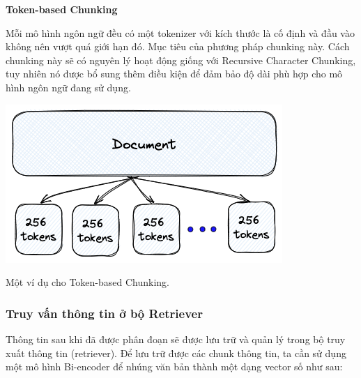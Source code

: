 \documentclass[a4paper, 12pt, openany]{book}
\begin{document}
\vspace{0.5cm}

\textbf{Token-based Chunking}

Mỗi mô hình ngôn ngữ đều có một tokenizer với kích thước là cố định và đầu vào không nên vượt quá giới hạn đó. Mục tiêu của phương pháp chunking
này. Cách chunking này sẽ có nguyên lý hoạt động giống với Recursive Character Chunking, tuy nhiên nó được bổ sung thêm điều kiện để đảm bảo độ dài phù hợp
cho mô hình ngôn ngữ đang sử dụng.

\vspace{0.5cm}

\begin{minipage}{\linewidth}
    \centering
    \includegraphics[width=\linewidth]{./assets/images/token-chunking.png}
    \captionsetup{type=figure}
    \caption{Một ví dụ cho Token-based Chunking.}
\end{minipage}

\vspace{0.5cm}

\subsubsection{Truy vấn thông tin ở bộ Retriever}

Thông tin sau khi đã được phân đoạn sẽ được lưu trữ và quản lý trong bộ truy xuất thông tin (retriever).
Để lưu trữ được các chunk thông tin, ta cần sử dụng một mô hình Bi-encoder để nhúng văn bản thành một dạng vector số như sau:


\vspace{0.5cm}
\end{document}
